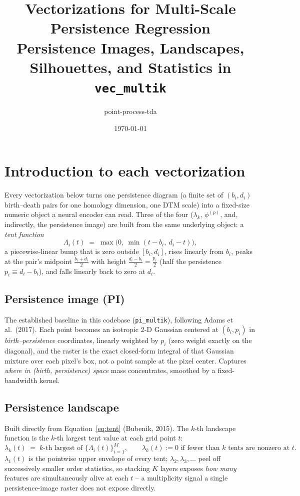 \documentclass[11pt]{article}
\title{Vectorizations for Multi-Scale Persistence Regression\\
\large Persistence Images, Landscapes, Silhouettes, and Statistics in \texorpdfstring{\texttt{vec\_multik}}{vec\_multik}}
\author{point-process-tda}
\date{\today}
\begin{document}
\maketitle
\vspace{-2em}
\tableofcontents

\section{Introduction to each vectorization}
\label{sec:intro}

Every vectorization below turns one persistence diagram (a finite set of $(b_i,d_i)$
birth--death pairs for one homology dimension, one DTM scale) into a fixed-size
numeric object a neural encoder can read. Three of the four ($\lambda_k$, $\phi^{(p)}$,
and, indirectly, the persistence image) are built from the same underlying object: a
\emph{tent function}
\begin{equation}
  \Lambda_i(t) \;=\; \max\bigl(0,\ \min(t-b_i,\ d_i-t)\bigr),
  \label{eq:tent}
\end{equation}
a piecewise-linear bump that is zero outside $[b_i,d_i]$, rises linearly from $b_i$,
peaks at the pair's midpoint $\tfrac{b_i+d_i}{2}$ with height $\tfrac{d_i-b_i}{2} =
\tfrac{p_i}{2}$ (half the persistence $p_i \equiv d_i - b_i$), and falls linearly back
to zero at $d_i$.

\subsection{Persistence image (PI)}
The established baseline in this codebase (\texttt{pi\_multik}), following Adams et
al.\ (2017). Each point becomes an isotropic 2-D Gaussian centered at
$(b_i, p_i)$ in \emph{birth--persistence} coordinates, linearly weighted by $p_i$ (zero
weight exactly on the diagonal), and the raster is the exact closed-form integral of
that Gaussian mixture over each pixel's box, not a point sample at the pixel center.
Captures \emph{where in (birth, persistence) space} mass concentrates, smoothed by a
fixed-bandwidth kernel.

\subsection{Persistence landscape}
Built directly from Equation~\ref{eq:tent} (Bubenik, 2015). The $k$-th landscape
function is the $k$-th largest tent value at each grid point $t$:
\begin{equation}
  \lambda_k(t) \;=\; k\text{-th largest of } \{\Lambda_i(t)\}_{i=1}^{M},
  \qquad \lambda_k(t) := 0 \text{ if fewer than } k \text{ tents are nonzero at } t.
  \label{eq:landscape}
\end{equation}
$\lambda_1(t)$ is the pointwise upper envelope of every tent; $\lambda_2, \lambda_3,
\ldots$ peel off successively smaller order statistics, so stacking $K$ layers exposes
\emph{how many} features are simultaneously alive at each $t$ -- a multiplicity signal
a single persistence-image raster does not expose directly.
\end{document}

